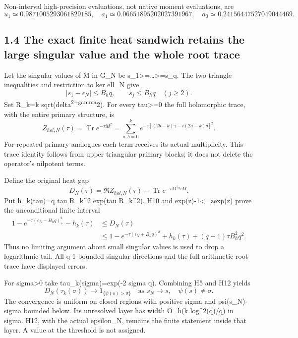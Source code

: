 Non-interval high-precision evaluations, not native moment evaluations, are \[
 u_1\simeq0.9871005293061829185,\quad
 a_1\simeq0.06651895202027391967,\quad
 a_0\simeq0.24156447527049044469.
\]

\subsection{1.4 The exact finite heat sandwich retains the large singular value and the whole root trace}\label{the-exact-finite-heat-sandwich-retains-the-large-singular-value-and-the-whole-root-trace}

Let the singular values of M in G\_N be s\_1\textgreater=\ldots\textgreater=s\_q. The two triangle inequalities and restriction to ker ell\_N give \[
 |s_1-\epsilon_N|\le B_hq,\qquad s_j\le B_hq\quad(j\ge2).
 \tag{H10}
\] Set R\_k=k sqrt(delta\textsuperscript{2+gamma}2). For every tau\textgreater=0 the full holomorphic trace, with the entire primary structure, is \[
 Z_{hol,N}(\tau)=\operatorname{Tr}e^{-\tau M^2}
 =\sum_{a,b=0}^k e^{-\tau[(2b-k)\gamma-i(2a-k)\delta]^2}.
 \tag{H11}
\] For repeated-primary analogues each term receives its actual multiplicity. This trace identity follows from upper triangular primary blocks; it does not delete the operator's nilpotent terms.

Define the original heat gap \[
 D_N(\tau)=\Re Z_{hol,N}(\tau)-\operatorname{Tr}e^{-\tau M^{\dagger_{G_N}}M}.
\] Put h\_k(tau)=q tau R\_k\^{}2 exp(tau R\_k\^{}2). H10 and \textbar exp(z)-1\textbar\textless=\textbar z\textbar exp(\textbar z\textbar) prove the unconditional finite interval \[
 \boxed{\begin{aligned}
 1-e^{-\tau(\epsilon_N-B_hq)_+^2}-h_k(\tau)
 &\le D_N(\tau)\\
 &\le1-e^{-\tau(\epsilon_N+B_hq)^2}
       +h_k(\tau)+(q-1)\tau B_h^2q^2.
 \end{aligned}}\tag{H12}
\] Thus no limiting argument about small singular values is used to drop a logarithmic tail. All q-1 bounded singular directions and the full arithmetic-root trace have displayed errors.

For sigma\textgreater0 take tau\_k(sigma)=exp(-2 sigma q). Combining H5 and H12 yields \[
 \boxed{D_N(\tau_k(\sigma))\longrightarrow
        1_{\{\psi(s)>\sigma\}}}\quad\text{as }s_N\to s,
        \quad\psi(s)\ne\sigma.\tag{H13}
\] The convergence is uniform on closed regions with positive sigma and \textbar psi(s\_N)-sigma\textbar{} bounded below. Its unresolved layer has width O\_h(k log\^{}2(q)/q) in sigma. H12, with the actual epsilon\_N, remains the finite statement inside that layer. A value at the threshold is not assigned.

